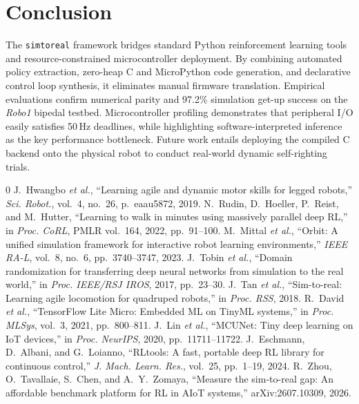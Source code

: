 \documentclass[10pt, conference, a4paper]{IEEEtran}
\begin{document}
\section{Conclusion}
\label{sec:conclusion}

The \texttt{simtoreal} framework bridges standard Python reinforcement learning tools and resource-constrained microcontroller deployment. By combining automated policy extraction, zero-heap C and MicroPython code generation, and declarative control loop synthesis, it eliminates manual firmware translation. Empirical evaluations confirm numerical parity and 97.2\% simulation get-up success on the \textit{Robo1} bipedal testbed. Microcontroller profiling demonstrates that peripheral I/O easily satisfies 50\,Hz deadlines, while highlighting software-interpreted inference as the key performance bottleneck. Future work entails deploying the compiled C backend onto the physical robot to conduct real-world dynamic self-righting trials.

\begin{thebibliography}{0}
\setlength{\itemsep}{-0.5pt}
\setlength{\parsep}{0pt}
\tiny
{}
J.~Hwangbo \textit{et al.}, ``Learning agile and dynamic motor skills for legged robots,'' \textit{Sci. Robot.}, vol.~4, no.~26, p.~eaau5872, 2019.
N.~Rudin, D.~Hoeller, P.~Reist, and M.~Hutter, ``Learning to walk in minutes using massively parallel deep RL,'' in \textit{Proc. CoRL}, PMLR vol.~164, 2022, pp.~91--100.
M.~Mittal \textit{et al.}, ``Orbit: A unified simulation framework for interactive robot learning environments,'' \textit{IEEE RA-L}, vol.~8, no.~6, pp.~3740--3747, 2023.
J.~Tobin \textit{et al.}, ``Domain randomization for transferring deep neural networks from simulation to the real world,'' in \textit{Proc. IEEE/RSJ IROS}, 2017, pp.~23--30.
J.~Tan \textit{et al.}, ``Sim-to-real: Learning agile locomotion for quadruped robots,'' in \textit{Proc. RSS}, 2018.
R.~David \textit{et al.}, ``TensorFlow Lite Micro: Embedded ML on TinyML systems,'' in \textit{Proc. MLSys}, vol.~3, 2021, pp.~800--811.
J.~Lin \textit{et al.}, ``MCUNet: Tiny deep learning on IoT devices,'' in \textit{Proc. NeurIPS}, 2020, pp.~11711--11722.
J.~Eschmann, D.~Albani, and G.~Loianno, ``RLtools: A fast, portable deep RL library for continuous control,'' \textit{J. Mach. Learn. Res.}, vol.~25, pp.~1--19, 2024.
R.~Zhou, O.~Tavallaie, S.~Chen, and A.~Y.~Zomaya, ``Measure the sim-to-real gap: An affordable benchmark platform for RL in AIoT systems,'' arXiv:2607.10309, 2026.
\end{thebibliography}
\end{document}

